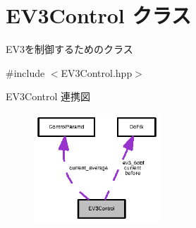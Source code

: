 \section{E\-V3\-Control クラス}
\label{class_e_v3_control}


E\-V3を制御するためのクラス  




{\ttfamily \#include $<$E\-V3\-Control.\-hpp$>$}



E\-V3\-Control 連携図\nopagebreak
\begin{figure}[H]
\begin{center}
\leavevmode
\includegraphics[width=134pt]{class_e_v3_control__coll__graph}
\end{center}
\end{figure}
